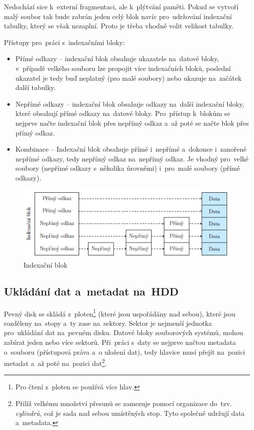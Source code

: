 Nedochází sice k~externí fragmentaci, ale k~plýtvání paměti. Pokud se vytvoří malý soubor tak bude zabrán jeden celý blok navíc pro~udržování indexační tabulky, který se však nezaplní. Proto je třeba vhodně volit velikost tabulky.

Přístupy pro~práci s~indexačními bloky:
\begin{itemize}
	\item Přímé odkazy -- indexační blok obsahuje ukazatele na~datové bloky, v~případě velkého souboru lze propojit více indexačních bloků, poslední ukazatel je tedy buď neplatný (pro malé soubory) nebo ukazuje na~začátek další tabulky.
	\item Nepřímé odkazy -- indexační blok obsahuje odkazy na~další indexační bloky, které obsahují přímé odkazy na~datové bloky. Pro~přístup k~blokům se nejprve načte indexační blok přes nepřímý odkaz a~až poté se načte blok přes přímý odkaz.
	\item Kombinace -- Indexační blok obsahuje přímé i~nepřímé a~dokonce i~zanořené nepřímé odkazy, tedy nepřímý odkaz na~nepřímý odkaz. Je vhodný pro~velké soubory (nepřímé odkazy s~několika úrovněmi) i~pro~malé soubory (přímé odkazy).
\end{itemize}

\begin{figure}[ht]
	\centering
	\includegraphics[scale=1.2]{images/mem_block_index.png}
	\caption{Indexační blok}
	\label{mem_block_index}
\end{figure}

\subsection{Ukládání dat a~metadat na~HDD}

Pevný disk se skládá z~ploten\footnote{Pro čtení z~ploten se používá více hlav.} (které jsou uspořádány nad sebou), které jsou rozděleny na~stopy a~ty zase na~sektory. Sektor je nejmenší jednotka pro~ukládání dat na~pevném disku. Datové bloky souborových systémů, mohou zabírat jeden nebo více sektorů. Při~práci s~daty se nejprve načtou metadata o~souboru (přístupová práva a~o uložení dat), tedy hlavice musí přejít na~pozici metadat a~až poté na~pozici dat\footnote{Přilíž velkému množství přesunů se zamezuje pomocí organizace do~tzv. \emph{cylindrů}, což je sada nad sebou umístěných stop. Tyto společně udržují data a~metadata.}.

